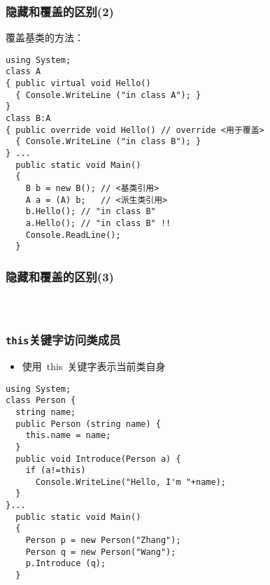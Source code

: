 \begin{frame}[fragile]
\frametitle{隐藏和覆盖的区别(2)}
覆盖基类的方法：
\begin{lstlisting}[escapeinside=<>]
using System;
class A
{ public virtual void Hello()
  { Console.WriteLine ("in class A"); }
}
class B:A
{ public override void Hello() // override <用于覆盖>
  { Console.WriteLine ("in class B"); }
} ...
  public static void Main()
  {
    B b = new B(); // <基类引用>
    A a = (A) b;   // <派生类引用>
    b.Hello(); // "in class B"
    a.Hello(); // "in class B" !!
    Console.ReadLine();
  }

\end{lstlisting}
\end{frame}

\begin{frame}[fragile]
\frametitle{隐藏和覆盖的区别(3)}
\begin{columns}
  \begin{figure}
    \centering
    
  \end{figure}
\end{columns}
\end{frame}

\begin{frame}[fragile]
\frametitle{\texttt{this}关键字访问类成员}
\begin{itemize}
\item 使用~this~关键字表示当前类自身
\end{itemize}
\begin{lstlisting}
using System;
class Person {
  string name;
  public Person (string name) {
    this.name = name;
  }
  public void Introduce(Person a) {
    if (a!=this)
      Console.WriteLine("Hello, I'm "+name);
  }
}...
  public static void Main()
  {
    Person p = new Person("Zhang");
    Person q = new Person("Wang");
    p.Introduce (q);
  }
\end{lstlisting}
\end{frame}

